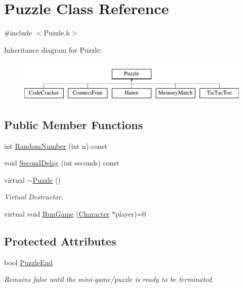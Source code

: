 \hypertarget{classPuzzle}{\section{Puzzle Class Reference}
\label{classPuzzle}
}


{\ttfamily \#include $<$Puzzle.\-h$>$}

Inheritance diagram for Puzzle\-:\begin{figure}[H]
\begin{center}
\leavevmode
\includegraphics[height=2.000000cm]{classPuzzle}
\end{center}
\end{figure}
\subsection*{Public Member Functions}
\begin{DoxyCompactItemize}
\item 
int \hyperlink{classPuzzle_ad0be5c887460d0b386bf5d97264f0c24}{Random\-Number} (int n) const 
\item 
void \hyperlink{classPuzzle_ac25f8ddec23bc739d3e3ca8738316d8a}{Second\-Delay} (int seconds) const 
\item 
virtual \hyperlink{classPuzzle_a4319df1536a07cd1aaf23b27aeb53579}{$\sim$\-Puzzle} ()
\begin{DoxyCompactList}\small\item\em Virtual Destructor. \end{DoxyCompactList}\item 
virtual void \hyperlink{classPuzzle_a134875b96b18d9963d2b018fd14e7ab9}{Run\-Game} (\hyperlink{classCharacter}{Character} $\ast$player)=0
\end{DoxyCompactItemize}
\subsection*{Protected Attributes}
\begin{DoxyCompactItemize}
\item 
bool \hyperlink{classPuzzle_a965ad54e9f7340c3cad944fc82c61a2b}{Puzzle\-End}
\begin{DoxyCompactList}\small\item\em Remains false until the mini-\/game/puzzle is ready to be terminated. \end{DoxyCompactList}\end{DoxyCompactItemize}


